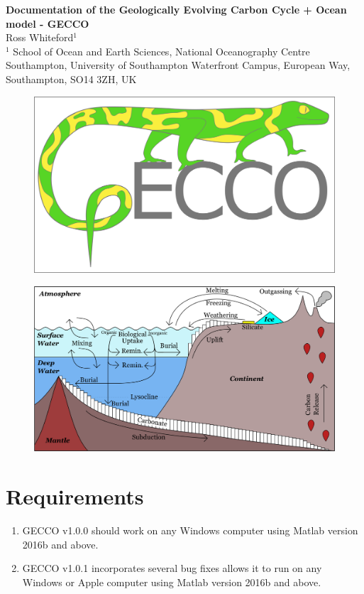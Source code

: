 \documentclass[12pt,twoside,onecolumn,a4paper]{article}
\begin{document}
{
\centering
{\fontsize{25}{40}\selectfont \textbf{Documentation of the Geologically Evolving Carbon Cycle + Ocean model - GECCO}} \\[0.3cm]
{\Huge Ross Whiteford$^1$} \\ [0.2cm]
$^1$ School of Ocean and Earth Sciences, National Oceanography Centre Southampton, University of Southampton Waterfront Campus, European Way, Southampton, SO14 3ZH, UK
}

\begin{figure}[H]
\centering
\includegraphics[width=12cm]{./../Resources/Logo.png}
\end{figure}


\begin{figure}[H]
\centering
\includegraphics[width=18cm]{./../Resources/Model_Schematic.pdf}
\end{figure}
\clearpage

\raggedright
\raggedbottom
\section{Requirements}
\begin{enumerate}
\item GECCO v1.0.0 should work on any Windows computer using Matlab version 2016b and above.
\item GECCO v1.0.1 incorporates several bug fixes allows it to run on any Windows or Apple computer using Matlab version 2016b and above.
\end{enumerate}
\end{document}
